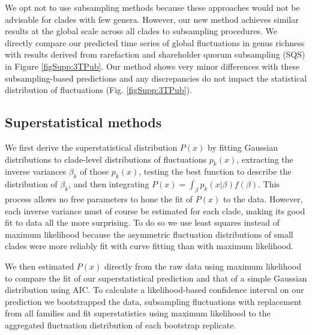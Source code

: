 \documentclass[12pt]{article}
\let\citep=\cite
\begin{document}
We opt not to use subsampling methods \citep{miller1996, alroy2010,
  kocsis2018} because these approaches would not be advisable for
clades with few genera. However, our new method achieves similar
results at the global scale across all clades to subsampling
procedures. We directly compare our predicted time series of global
fluctuations in genus richness with results derived from rarefaction
and shareholder quorum subsampling (SQS) in Figure
\ref{figSupp:3TPub}.  Our method shows very minor differences with
these subsampling-based predictions and any discrepancies do not
impact the statistical distribution of fluctuations
(Fig. \ref{figSupp:3TPub}).


\subsection{Superstatistical methods} \label{sec:numMeth}

We first derive the superstatistical distribution $P(x)$ by fitting
Gaussian distributions to clade-level distributions of fluctuations
$p_k(x)$, extracting the inverse variances $\beta_k$ of those
$p_k(x)$, testing the best function to describe the distribution of
$\beta_k$, and then integrating
$P(x) = \int_{\beta}p_k(x | \beta) f(\beta)$. This process allows no
free parameters to hone the fit of $P(x)$ to the data.  However, each
inverse variance must of course be estimated for each clade, making
its good fit to data all the more surprising.  To do so we use least
squares instead of maximum likelihood because the asymmetric
fluctuation distributions of small clades were more reliably fit with
curve fitting than with maximum likelihood.

We then estimated $P(x)$ directly from the raw data using maximum
likelihood to compare the fit of our superstatistical prediction and
that of a simple Gaussian distribution using AIC. To calculate a
likelihood-based confidence interval on our prediction we bootstrapped
the data, subsampling fluctuations with replacement from all families
and fit superstatistics using maximum likelihood to the aggregated
fluctuation distribution of each bootstrap replicate.



\end{document}
